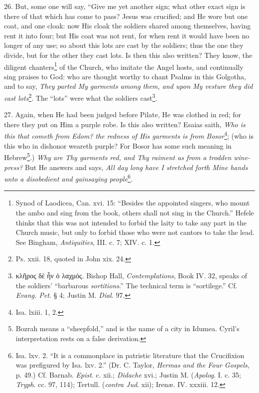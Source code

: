 26. But, some one will say, “Give me yet another sign; what other exact sign is there of that which has come to pass? Jesus was crucified; and He wore but one coat, and one cloak: now His cloak the soldiers shared among themselves, having rent it into four; but His coat was not rent, for when rent it would have been no longer of any use; so about this lots are cast by the soldiers; thus the one they divide, but for the other they cast lots. Is then this also written? They know, the diligent chanters\footnote{Synod of Laodicea, Can. xvi. 15: “Besides the appointed singers, who mount the ambo and sing from the book, others shall not sing in the Church.” Hefele thinks that this was not intended to forbid the laity to take any part in the Church music, but only to forbid those who were not cantors to take the lead. See Bingham, \emph{Antiquities}, III. c. 7; XIV. c. 1.} of the Church, who imitate the Angel hosts, and continually sing praises to God: who are thought worthy to chant Psalms in this Golgotha, and to say, \emph{They parted My garments among them, and upon My vesture they did cast lots}\footnote{Ps. xxii. 18, quoted in John xix. 24.}. The “lots” were what the soldiers cast\footnote{\textgreek{κλῆρος δὲ ἦν ὁ λαχμός}. Bishop Hall, \emph{Contemplations}, Book IV. 32, speaks of the soldiers’ “barbarous \emph{sortitions}.” The technical term is “sortilege.” Cf. \emph{Evang. Pet}. § 4; Justin M. \emph{Dial}. 97.}.

27. Again, when He had been judged before Pilate, He was clothed in red; for there they put on Him a purple robe. Is this also written? Esaias saith, \emph{Who is this that cometh from Edom? the redness of His garments is from Bosor}\footnote{Isa. lxiii. 1, 2.}; (who is this who in dishonor weareth purple? For Bosor has some such meaning in Hebrew\footnote{Bozrah means a “sheepfold,” and is the name of a city in Idumea. Cyril’s interpretation rests on a false derivation.}.) \emph{Why are Thy garments red, and Thy raiment as from a trodden wine-press? } But He answers and says, \emph{All day long have I stretched forth Mine hands unto a disobedient and gainsaying people}\footnote{Isa. lxv. 2. “It is a commonplace in patristic literature that the Crucifixion was prefigured by Isa. lxv. 2.” (Dr. C. Taylor, \emph{Hermas and the Four Gospels}, p. 49.) Cf. Barnab. \emph{Epist}. c. xii.; \emph{Didache} xvi.; Justin M. (\emph{Apolog}. I. c. 35; \emph{Tryph}. cc. 97, 114); Tertull. (\emph{contra Jud}. xii); Irenæ. IV. xxxiii. 12.}.

